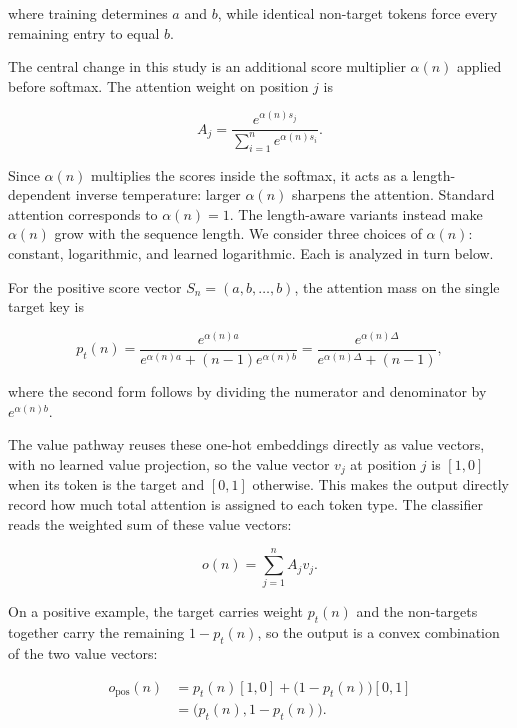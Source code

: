 \documentclass{article}
\begin{document}
where training determines $a$ and $b$, while identical non-target tokens force
every remaining entry to equal $b$.

The central change in this study is an additional score multiplier $\alpha(n)$
applied before softmax. The attention weight on position $j$ is

\begin{equation}
  A_j
  =
  \frac{e^{\alpha(n)s_j}}
       {\sum_{i=1}^{n}e^{\alpha(n)s_i}}.
  \label{eq:attention-weight}
\end{equation}

Since $\alpha(n)$ multiplies the scores inside the softmax, it acts as a
length-dependent inverse temperature: larger $\alpha(n)$ sharpens the
attention. Standard attention corresponds to $\alpha(n)=1$. The length-aware
variants instead make $\alpha(n)$ grow with the sequence length. We consider
three choices of $\alpha(n)$: constant, logarithmic, and learned logarithmic.
Each is analyzed in turn below.

For the positive score vector $S_n=(a,b,\ldots,b)$, the attention mass on the
single target key is

\begin{equation}
  p_t(n)
  =
  \frac{e^{\alpha(n)a}}
       {e^{\alpha(n)a}+(n-1)e^{\alpha(n)b}}
  =
  \frac{e^{\alpha(n)\Delta}}
       {e^{\alpha(n)\Delta}+(n-1)},
  \label{eq:target-attention}
\end{equation}

where the second form follows by dividing the numerator and denominator by
$e^{\alpha(n)b}$.

The value pathway reuses these one-hot embeddings directly as value vectors,
with no learned value projection, so the value vector $v_j$ at position $j$ is
$[1,0]$ when its token is the target and $[0,1]$ otherwise. This makes the
output directly record how much total attention is assigned to each token type.
The classifier reads the weighted sum of these value vectors:

\begin{equation}
  o(n)=\sum_{j=1}^{n}A_jv_j.
  \label{eq:attention-output}
\end{equation}

On a positive example, the target carries weight $p_t(n)$ and the non-targets
together carry the remaining $1-p_t(n)$, so the output is a convex combination
of the two value vectors:

\begin{align}
  o_{\text{pos}}(n)
  &=p_t(n)[1,0]+\bigl(1-p_t(n)\bigr)[0,1]
  \nonumber\\
  &=\bigl(p_t(n),1-p_t(n)\bigr).
  \label{eq:positive-output}
\end{align}
\end{document}
